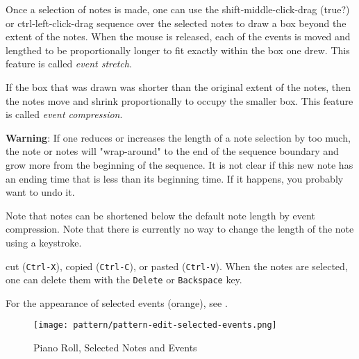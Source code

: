    Once a selection of notes is made, one can use the
   shift-middle-click-drag (true?) or ctrl-left-click-drag
   sequence over the selected notes to
   draw a box beyond the extent of the notes.  When the mouse is released,
   each of the events is moved and lengthed to be proportionally longer to
   fit exactly within the box one drew.
   This feature is called \textsl{event stretch}.

   If the box that was drawn was shorter than the original extent of the
   notes, then the notes move and shrink proportionally to occupy the
   smaller box.
   This feature is called \textsl{event compression}.
   
   \textbf{Warning}:  If one reduces or increases the length of a note selection
   by too much, the note or notes will "wrap-around" to the end of the sequence
   boundary and grow more from the beginning of the sequence. 
   It is not clear if this new note has an ending time that is less than its
   beginning time.  If it happens, you probably want to undo it.

   Note that notes can be shortened below the default note length by event
   compression.  Note that there is currently no way to change the length of
   the note using a keystroke.

    cut (\texttt{Ctrl-X}), 
    copied (\texttt{Ctrl-C}),
    or pasted (\texttt{Ctrl-V}).
   When the notes are selected,
   one can delete them with the \texttt{Delete} or \texttt{Backspace} key.

   For the appearance of selected events (orange), see
   .

\begin{figure}[H]
   \centering 
   \texttt{[image: pattern/pattern-edit-selected-events.png]}
   \caption{Piano Roll, Selected Notes and Events}
   \label{fig:pattern_editor_selected_events}
\end{figure}
   
